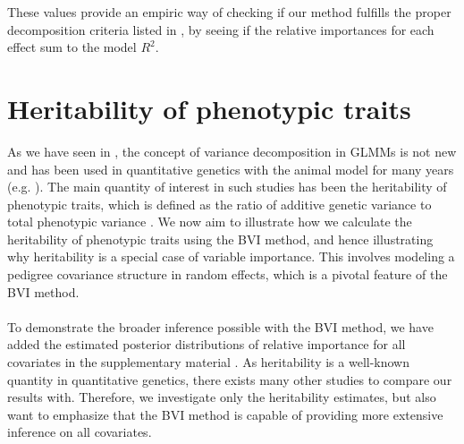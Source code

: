 \noindent These values provide an empiric way of checking if our method fulfills the proper decomposition criteria listed in , by seeing if the relative importances for each effect sum to the model $R^2$.


\section{Heritability of phenotypic traits}
\label{sec:heritability_method}
As we have seen in , the concept of variance decomposition in GLMMs is not new and has been used in quantitative genetics with the animal model for many years (e.g. \citet{Kruuk2004}). The main quantity of interest in such studies has been the heritability of phenotypic traits, which is defined as the ratio of additive genetic variance to total phenotypic variance \citep{Wilson_heritability}. We now aim to illustrate how we calculate the heritability of phenotypic traits using the BVI method, and hence illustrating why heritability is a special case of variable importance. This involves modeling a pedigree covariance structure in random effects, which is a pivotal feature of the BVI method.
\\
\\
To demonstrate the broader inference possible with the BVI method, we have added the estimated posterior distributions of relative importance for all covariates in the supplementary material . As heritability is a well-known quantity in quantitative genetics, there exists many other studies to compare our results with. Therefore, we investigate only the heritability estimates, but also want to emphasize that the BVI method is capable of providing more extensive inference on all covariates. 
